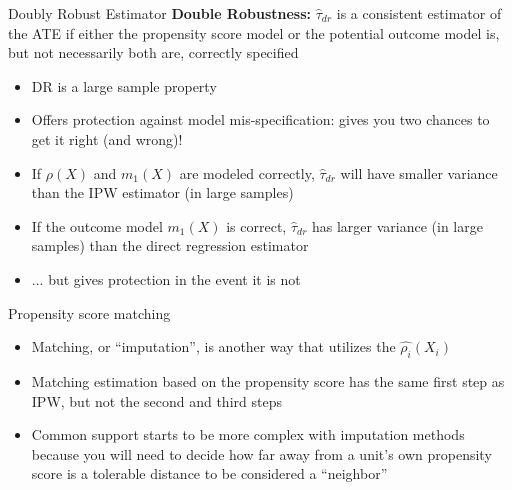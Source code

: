 \documentclass{beamer}
\begin{document}
\begin{frame}{Doubly Robust Estimator}
    \textbf{Double Robustness:} \( \hat{\tau}_{dr} \) is a consistent estimator of the ATE if either
    the propensity score model or the potential outcome model is, but not
    necessarily both are, correctly specified

    \begin{itemize}
        \item DR is a large sample property
        \item Offers protection against model mis-specification: gives you two
        chances to get it right (and wrong)!
        \item If \( \rho(X) \) and \( m_1(X) \) are modeled correctly, \( \hat{\tau}_{dr} \) will have smaller
        variance than the IPW estimator (in large samples)
        \item If the outcome model \( m_1(X) \) is correct, \( \hat{\tau}_{dr} \) has larger variance (in
        large samples) than the direct regression estimator
        \item ... but gives protection in the event it is not
    \end{itemize}
\end{frame}








\begin{frame}{Propensity score matching}
	
	\begin{itemize}
	\item Matching, or ``imputation'', is another way that utilizes the $\widehat{\rho_i}(X_i)$
	\item Matching estimation based on the propensity score has the same first step as IPW, but not the second and third steps
	\item Common support starts to be more complex with imputation methods because you will need to decide how far away from a unit's own propensity score is a tolerable distance to be considered a ``neighbor''
	\end{itemize}

\end{frame}
\end{document}
